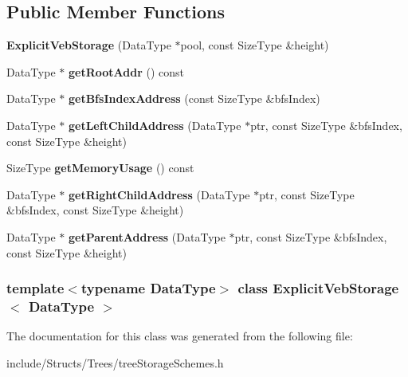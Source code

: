 \subsection*{Public Member Functions}
\begin{DoxyCompactItemize}
\item 
\hypertarget{class_explicit_veb_storage_a8edbfd29420bc009e7dd07f08f91bb0b}{
{\bfseries ExplicitVebStorage} (DataType $\ast$pool, const SizeType \&height)}
\label{class_explicit_veb_storage_a8edbfd29420bc009e7dd07f08f91bb0b}

\item 
\hypertarget{class_explicit_veb_storage_af4e6b74b0e2a9ebebf6a7bd19270cc8c}{
DataType $\ast$ {\bfseries getRootAddr} () const }
\label{class_explicit_veb_storage_af4e6b74b0e2a9ebebf6a7bd19270cc8c}

\item 
\hypertarget{class_explicit_veb_storage_a921fc136cce7a8ab0c4577240f7db6bc}{
DataType $\ast$ {\bfseries getBfsIndexAddress} (const SizeType \&bfsIndex)}
\label{class_explicit_veb_storage_a921fc136cce7a8ab0c4577240f7db6bc}

\item 
\hypertarget{class_explicit_veb_storage_a977234c60f97321aea9ecd367463a52a}{
DataType $\ast$ {\bfseries getLeftChildAddress} (DataType $\ast$ptr, const SizeType \&bfsIndex, const SizeType \&height)}
\label{class_explicit_veb_storage_a977234c60f97321aea9ecd367463a52a}

\item 
\hypertarget{class_explicit_veb_storage_a048f84ce79f7e513f9aa40c30bcb6f3c}{
SizeType {\bfseries getMemoryUsage} () const }
\label{class_explicit_veb_storage_a048f84ce79f7e513f9aa40c30bcb6f3c}

\item 
\hypertarget{class_explicit_veb_storage_a1b64cf679c7c098ec8d5ded16a1ddaaa}{
DataType $\ast$ {\bfseries getRightChildAddress} (DataType $\ast$ptr, const SizeType \&bfsIndex, const SizeType \&height)}
\label{class_explicit_veb_storage_a1b64cf679c7c098ec8d5ded16a1ddaaa}

\item 
\hypertarget{class_explicit_veb_storage_af6c0e66c3d9a926dcb37e6e99b828ade}{
DataType $\ast$ {\bfseries getParentAddress} (DataType $\ast$ptr, const SizeType \&bfsIndex, const SizeType \&height)}
\label{class_explicit_veb_storage_af6c0e66c3d9a926dcb37e6e99b828ade}

\end{DoxyCompactItemize}
\subsubsection*{template$<$typename DataType$>$ class ExplicitVebStorage$<$ DataType $>$}



The documentation for this class was generated from the following file:\begin{DoxyCompactItemize}
\item 
include/Structs/Trees/treeStorageSchemes.h\end{DoxyCompactItemize}
